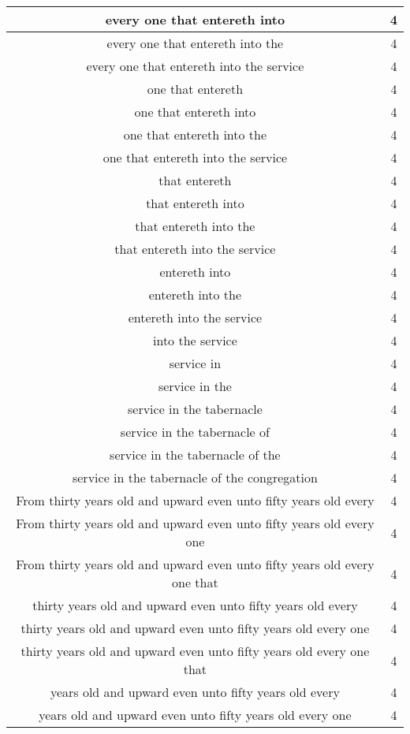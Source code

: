 \begin{center}
\begin{longtable}{|c|c|}
every one that entereth into & 4\\ \hline 
every one that entereth into the & 4\\ \hline 
every one that entereth into the service & 4\\ \hline 
one that entereth & 4\\ \hline 
one that entereth into & 4\\ \hline 
one that entereth into the & 4\\ \hline 
one that entereth into the service & 4\\ \hline 
that entereth & 4\\ \hline 
that entereth into & 4\\ \hline 
that entereth into the & 4\\ \hline 
that entereth into the service & 4\\ \hline 
entereth into & 4\\ \hline 
entereth into the & 4\\ \hline 
entereth into the service & 4\\ \hline 
into the service & 4\\ \hline 
service in & 4\\ \hline 
service in the & 4\\ \hline 
service in the tabernacle & 4\\ \hline 
service in the tabernacle of & 4\\ \hline 
service in the tabernacle of the & 4\\ \hline 
service in the tabernacle of the congregation & 4\\ \hline 
From thirty years old and upward even unto fifty years old every & 4\\ \hline 
From thirty years old and upward even unto fifty years old every one & 4\\ \hline 
From thirty years old and upward even unto fifty years old every one that & 4\\ \hline 
thirty years old and upward even unto fifty years old every & 4\\ \hline 
thirty years old and upward even unto fifty years old every one & 4\\ \hline 
thirty years old and upward even unto fifty years old every one that & 4\\ \hline 
years old and upward even unto fifty years old every & 4\\ \hline 
years old and upward even unto fifty years old every one & 4\\ \hline 

\end{longtable}
\end{center}
